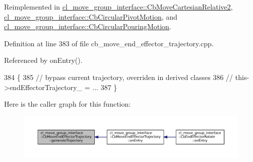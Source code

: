 Reimplemented in \hyperlink{classcl__move__group__interface_1_1CbMoveCartesianRelative2_a6ba51647d197e874a87289a90ff8e0f1}{cl\+\_\+move\+\_\+group\+\_\+interface\+::\+Cb\+Move\+Cartesian\+Relative2}, \hyperlink{classcl__move__group__interface_1_1CbCircularPivotMotion_a8d019ec6b9b26a2af0740b915d441a40}{cl\+\_\+move\+\_\+group\+\_\+interface\+::\+Cb\+Circular\+Pivot\+Motion}, and \hyperlink{classcl__move__group__interface_1_1CbCircularPouringMotion_a9150bb3731082aad3af2d7d6e067a344}{cl\+\_\+move\+\_\+group\+\_\+interface\+::\+Cb\+Circular\+Pouring\+Motion}.



Definition at line 383 of file cb\+\_\+move\+\_\+end\+\_\+effector\+\_\+trajectory.\+cpp.



Referenced by on\+Entry().


\begin{DoxyCode}
384     \{
385         \textcolor{comment}{// bypass current trajectory, overriden in derived classes}
386         \textcolor{comment}{// this->endEffectorTrajectory\_ = ...}
387     \}
\end{DoxyCode}
Here is the caller graph for this function\+:
\nopagebreak
\begin{figure}[H]
\begin{center}
\leavevmode
\includegraphics[width=350pt]{classcl__move__group__interface_1_1CbMoveEndEffectorTrajectory_aeae938ab66e18ab7d2fb2427bc83647b_icgraph}
\end{center}
\end{figure}
\mbox{\label{classcl__move__group__interface_1_1CbMoveEndEffectorTrajectory_a56945ccfff51e3eb9ec9c2edcfa132af}} 

